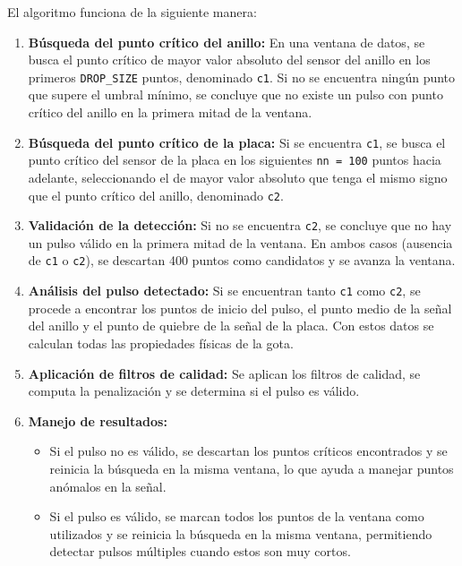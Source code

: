 \documentclass[12pt,a4paper]{article}
\begin{document}
El algoritmo funciona de la siguiente manera:

\begin{enumerate}
    \item \textbf{Búsqueda del punto crítico del anillo:} En una ventana de datos, se busca el punto crítico de mayor valor absoluto del sensor del anillo en los primeros \texttt{DROP\_SIZE} puntos, denominado \texttt{c1}. Si no se encuentra ningún punto que supere el umbral mínimo, se concluye que no existe un pulso con punto crítico del anillo en la primera mitad de la ventana.
    
    \item \textbf{Búsqueda del punto crítico de la placa:} Si se encuentra \texttt{c1}, se busca el punto crítico del sensor de la placa en los siguientes \texttt{nn = 100} puntos hacia adelante, seleccionando el de mayor valor absoluto que tenga el mismo signo que el punto crítico del anillo, denominado \texttt{c2}.
    
    \item \textbf{Validación de la detección:} Si no se encuentra \texttt{c2}, se concluye que no hay un pulso válido en la primera mitad de la ventana. En ambos casos (ausencia de \texttt{c1} o \texttt{c2}), se descartan 400 puntos como candidatos y se avanza la ventana.
    
    \item \textbf{Análisis del pulso detectado:} Si se encuentran tanto \texttt{c1} como \texttt{c2}, se procede a encontrar los puntos de inicio del pulso, el punto medio de la señal del anillo y el punto de quiebre de la señal de la placa. Con estos datos se calculan todas las propiedades físicas de la gota.
    
    \item \textbf{Aplicación de filtros de calidad:} Se aplican los filtros de calidad, se computa la penalización y se determina si el pulso es válido.
    
    \item \textbf{Manejo de resultados:} 
    \begin{itemize}
        \item Si el pulso no es válido, se descartan los puntos críticos encontrados y se reinicia la búsqueda en la misma ventana, lo que ayuda a manejar puntos anómalos en la señal.
        \item Si el pulso es válido, se marcan todos los puntos de la ventana como utilizados y se reinicia la búsqueda en la misma ventana, permitiendo detectar pulsos múltiples cuando estos son muy cortos.
    \end{itemize}
\end{enumerate}
\end{document}
